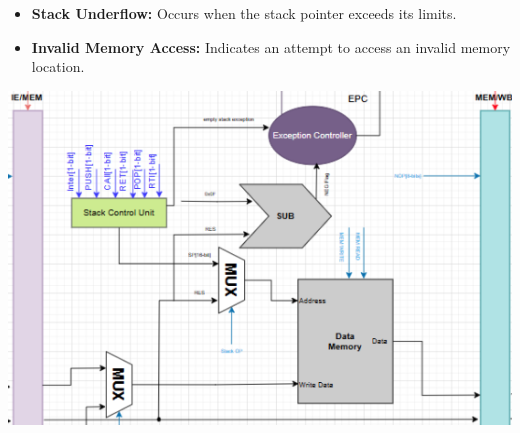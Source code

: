 \documentclass{report}
\begin{document}
\begin{itemize}
    \item \textbf{Stack Underflow:} Occurs when the stack pointer exceeds its limits.
    \item \textbf{Invalid Memory Access:} Indicates an attempt to access an invalid memory location.
\end{itemize}

\begin{center}
    \begin{minipage}{0.75\textwidth}
    \includegraphics[width=\textwidth]{./assets/EC.png}
    \end{minipage}
    \end{center}
\end{document}
